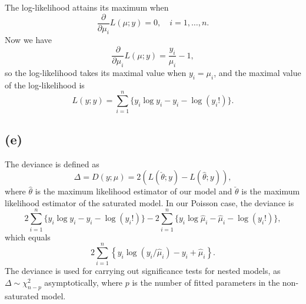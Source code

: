 The log-likelihood attains its maximum when
\[
\frac{\partial}{\partial\mu_{i}}L(\mu;y)=0,\quad i=1,\ldots,n.
\]
Now we have
\[
\frac{\partial}{\partial\mu_{i}}L(\mu;y)=\frac{y_{i}}{\mu_{i}}-1,
\]
so the log-likelihood takes its maximal value when $y_{i}=\mu_{i}$,
and the maximal value of the log-likelihood is
\[
L(y;y)=\sum_{i=1}^{n}\{y_{i}\log y_{i}-y_{i}-\log(y_{i}!)\}.
\]
\subsection*{(e)}
The deviance is defined as
\[
\Delta=D(y;\mu)=2\left(L(\check{\theta};y)-L(\hat{\theta};y)\right),
\]
where $\hat{\theta}$ is the maximum likelihood estimator of our model
and $\check{\theta}$ is the maximum likelihood estimator of the saturated
model. In our Poisson case, the deviance is
\[
2\sum_{i=1}^{n}\{y_{i}\log y_{i}-y_{i}-\log(y_{i}!)\}-2\sum_{i=1}^{n}\{y_{i}\log\hat{\mu}_{i}-\hat{\mu}_{i}-\log(y_{i}!)\},
\]
which equals
\[
2\sum_{i=1}^{n}\left\{ y_{i}\log(y_{i}/\hat{\mu}_{i})-y_{i}+\hat{\mu}_{i}\right\} .
\]
The deviance is used for carrying out significance tests for nested
models, as $\Delta\sim\chi_{n-p}^{2}$ asymptotically, where $p$
is the number of fitted parameters in the non-saturated model.